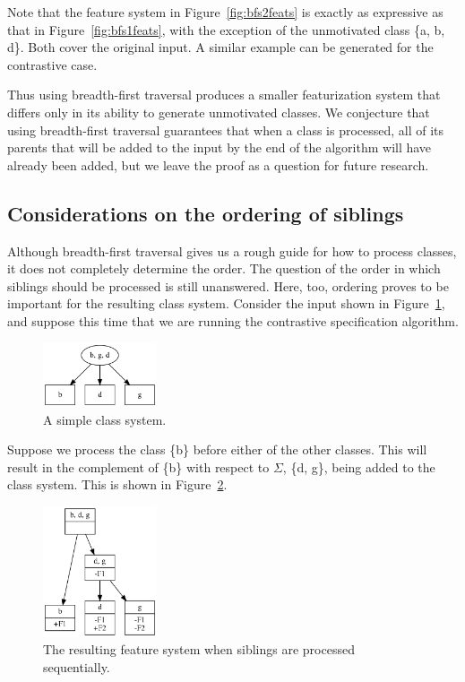\documentclass[11pt, oneside]{article}   	%
\begin{document}
Note that the feature system in Figure~\ref{fig:bfs2feats} is exactly as expressive as that in Figure~\ref{fig:bfs1feats}, with the exception of the unmotivated class \{a, b, d\}. Both cover the original input. A similar example can be generated for the contrastive case.

Thus using breadth-first traversal produces a smaller featurization system that differs only in its ability to generate unmotivated classes. We conjecture that using breadth-first traversal guarantees that when a class is processed, all of its parents that will be added to the input by the end of the algorithm will have already been added, but we leave the proof as a question for future research.

\subsection{Considerations on the ordering of siblings}
\label{app:siblings}

Although breadth-first traversal gives us a rough guide for how to process classes, it does not completely determine the order. The question of the order in which siblings should be processed is still unanswered. Here, too, ordering proves to be important for the resulting class system. Consider the input shown in Figure~\ref{fig:siblinginput}, and suppose this time that we are running the contrastive specification algorithm.

\begin{figure}[htb!]
	\centering
	\includegraphics[width=0.3\textwidth]{sibling_input.png}
	\caption{A simple class system.}
	\label{fig:siblinginput}
\end{figure}

Suppose we process the class \{b\} before either of the other classes. This will result in the complement of \{b\} with respect to $\Sigma$, \{d, g\}, being added to the class system. This is shown in Figure~\ref{fig:siblingoutput1}.

\begin{figure}[htb!]
	\centering
	\includegraphics[width=0.3\textwidth]{sibling_output1.png}
	\caption{The resulting feature system when siblings are processed sequentially.}
	\label{fig:siblingoutput1}
\end{figure}
\end{document}
